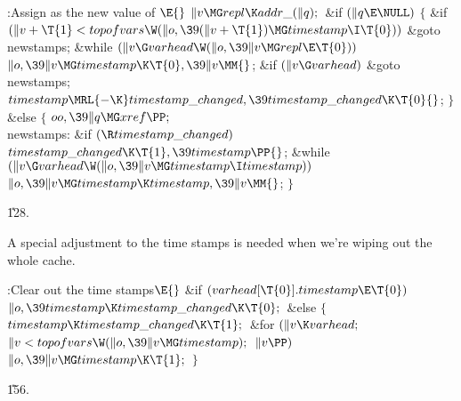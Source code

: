 \Y\B\4:Assign  as the new value of \X${}\E{}$%
\6
$\|v\MG\\{repl}\K\\{addr\_}(\|q);{}$\6
\&{if} ${}(\|q\E\NULL){}$\5
${}\{{}$\1\6
\&{if} ${}(\|v+\T{1}<\\{topofvars}\W(\|o,\39(\|v+\T{1})\MG\\{timestamp}\I%
\T{0})){}$\1\5
\&{goto} \\{newstamps};\2\6
\&{while} ${}(\|v\G\\{varhead}\W(\|o,\39\|v\MG\\{repl}\E\T{0})){}$\1\5
${}\|o,\39\|v\MG\\{timestamp}\K\T{0},\39\|v\MM{}$;\2\6
\&{if} ${}(\|v\G\\{varhead}){}$\1\5
\&{goto} \\{newstamps};\2\6
${}\\{timestamp}\MRL{-{\K}}\\{timestamp\_changed},\39\\{timestamp\_changed}\K%
\T{0}{}$;\6
\4${}\}{}$\5
\2\&{else}\5
${}\{{}$\1\6
${}\\{oo},\39\|q\MG\\{xref}\PP;{}$\6
\4\\{newstamps}:\5
\&{if} ${}(\R\\{timestamp\_changed}){}$\1\5
${}\\{timestamp\_changed}\K\T{1},\39\\{timestamp}\PP{}$;\2\6
\&{while} ${}(\|v\G\\{varhead}\W(\|o,\39\|v\MG\\{timestamp}\I\\{timestamp})){}$%
\1\5
${}\|o,\39\|v\MG\\{timestamp}\K\\{timestamp},\39\|v\MM{}$;\2\6
\4${}\}{}$\2\par
\U128.\fi

A special adjustment to the time stamps is needed when we're wiping out
the whole cache.

\Y\B\4:Clear out the time stamps\X${}\E{}$\6
\&{if} ${}(\\{varhead}[\T{0}].\\{timestamp}\E\T{0}){}$\1\5
${}\|o,\39\\{timestamp}\K\\{timestamp\_changed}\K\T{0};{}$\2\6
\&{else}\5
${}\{{}$\1\6
${}\\{timestamp}\K\\{timestamp\_changed}\K\T{1};{}$\6
\&{for} ${}(\|v\K\\{varhead};{}$ ${}\|v<\\{topofvars}\W(\|o,\39\|v\MG%
\\{timestamp});{}$ ${}\|v\PP){}$\1\5
${}\|o,\39\|v\MG\\{timestamp}\K\T{1};{}$\2\6
\4${}\}{}$\2\par
\U156.\fi

